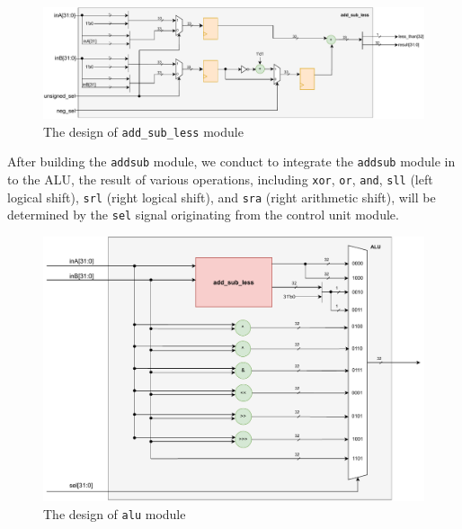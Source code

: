 \documentclass[12pt,a4paper,oneside]{book} %
\begin{document}
 \begin{figure}[H]
    \begin{center}
    \includegraphics[trim=0cm 0cm 0cm 0cm,clip,width=\textwidth]{images/addsub.pdf}
    \caption{The design of \texttt{add\_sub\_less} module}
    \end{center}
\end{figure}
After building the \texttt{addsub} module, we conduct to integrate the  \texttt{addsub} module in to the ALU, the result of various operations, including \texttt{xor}, \texttt{or}, \texttt{and}, \texttt{sll} (left logical shift), \texttt{srl} (right logical shift), and \texttt{sra} (right arithmetic shift), will be determined by the \texttt{sel} signal originating from the control unit module.
 \begin{figure}[H]
    \begin{center}
    \includegraphics[trim=0cm 0cm 0cm 0cm,clip,width=.90\textwidth]{images/alu}
    \caption{The design of \texttt{alu} module}
    \end{center}
\end{figure}
\end{document}
